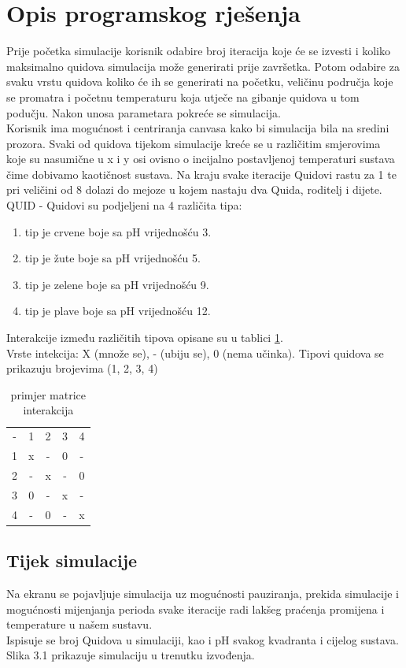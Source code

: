 \documentclass[12pt]{article}
\begin{document}
	\section{Opis programskog rješenja}
	Prije početka simulacije korisnik odabire broj iteracija koje će se izvesti i koliko maksimalno quidova simulacija može generirati prije završetka.
	Potom odabire za svaku vrstu quidova koliko će ih se generirati na početku, veličinu područja koje se promatra i početnu temperaturu koja utječe na gibanje quidova u tom podučju.
	Nakon unosa parametara pokreće se simulacija.\\
	Korisnik ima mogućnost i centriranja canvasa kako bi simulacija bila na sredini prozora.
	Svaki od quidova tijekom simulacije kreće se 
	u različitim smjerovima koje su nasumične u x i y osi ovisno o incijalno postavljenoj temperaturi sustava čime dobivamo kaotičnost sustava. Na kraju svake iteracije Quidovi rastu za 1 te pri veličini od 8 dolazi do mejoze u kojem nastaju dva Quida, roditelj i dijete.
\\
	
	QUID
- Quidovi su podjeljeni na 4 različita tipa:
	\begin{enumerate}
		\item tip je crvene boje sa pH vrijednošću 3. 
		\item tip je žute boje sa pH vrijednošću 5.
		\item tip je zelene boje sa pH vrijednošću 9.
		\item tip je plave boje sa pH vrijednošću 12.
	\end{enumerate}
	Interakcije između različitih tipova opisane su u tablici \ref{tab:firstTable}.\\
	Vrste intekcija: X (množe se), - (ubiju se), 0 (nema učinka).
	Tipovi quidova se prikazuju brojevima (1, 2, 3, 4)\\
	\begin{table}[ht]
		\centering
		\begin{tabular}{|ccccc|}
			- & 1 & 2 & 3 & 4 \\
			1 & x & - & 0 & - \\
			2 & - & x & - & 0 \\
			3 & 0 & - & x & - \\
			4 & - & 0 & - & x \\
		\end{tabular}
		\caption{primjer matrice interakcija}
		\label{tab:firstTable}
	\end{table}
	\subsection{Tijek simulacije}
	Na ekranu se pojavljuje simulacija uz mogućnosti pauziranja, prekida simulacije i mogućnosti mijenjanja perioda svake iteracije radi lakšeg praćenja
	promijena i temperature u našem sustavu.\\
	Ispisuje se broj Quidova u simulaciji, kao i pH svakog kvadranta i cijelog sustava. Slika 3.1 prikazuje simulaciju u trenutku izvođenja.\\
	
\end{document}
